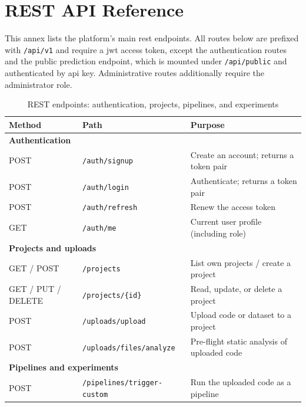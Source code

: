 \chapter{REST API Reference}
\label{app:api}

This annex lists the platform's main \gls{rest} endpoints. All routes below are
prefixed with \texttt{/api/v1} and require a \gls{jwt} access token, except the
authentication routes and the public prediction endpoint, which is mounted under
\texttt{/api/public} and authenticated by \gls{api} key. Administrative routes
additionally require the administrator role.

\begin{table}[H]\centering
\renewcommand{\arraystretch}{1.2}
\caption{REST endpoints: authentication, projects, pipelines, and experiments}
\label{tab:api-ref}
\footnotesize
\begin{tabularx}{\textwidth}{|p{2.1cm}|p{5.6cm}|X|}
\hline
\textbf{Method} & \textbf{Path} & \textbf{Purpose}\\
\hline
\multicolumn{3}{|l|}{\cellcolor{primary!12}\textbf{Authentication}}\\ \hline
POST & \texttt{/auth/signup} & Create an account; returns a token pair\\ \hline
POST & \texttt{/auth/login} & Authenticate; returns a token pair\\ \hline
POST & \texttt{/auth/refresh} & Renew the access token\\ \hline
GET  & \texttt{/auth/me} & Current user profile (including role)\\ \hline
\multicolumn{3}{|l|}{\cellcolor{primary!12}\textbf{Projects and uploads}}\\ \hline
GET / POST & \texttt{/projects} & List own projects / create a project\\ \hline
GET / PUT / DELETE & \texttt{/projects/\{id\}} & Read, update, or delete a project\\ \hline
POST & \texttt{/uploads/upload} & Upload code or dataset to a project\\ \hline
POST & \texttt{/uploads/files/analyze} & Pre-flight static analysis of uploaded code\\ \hline
\multicolumn{3}{|l|}{\cellcolor{primary!12}\textbf{Pipelines and experiments}}\\ \hline
POST & \texttt{/pipelines/trigger-custom} & Run the uploaded code as a pipeline\\ \hline

\end{tabularx}
\end{table}
